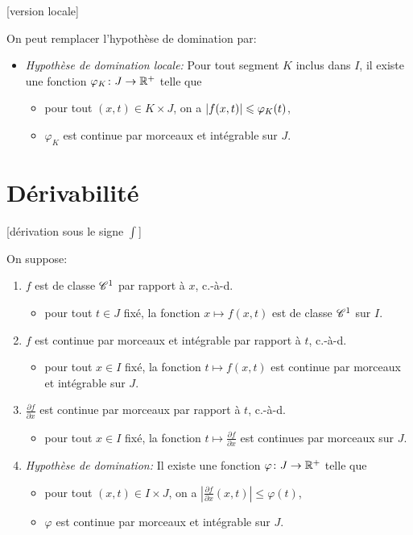 \documentclass{yann}
\newcommand\DerPart[2]{\frac{\partial#1}{\partial#2}}
\begin{document}
[version locale]

On peut remplacer l'hypothèse de domination par:
\begin{itemize}
\item
\emph{Hypothèse de domination locale:}
  Pour tout segment $K$ inclus dans $I$,
  il existe une fonction $\varphi_K \colon J \to \mathbb{R}^+$ telle que

  \begin{itemize}
  \item
pour tout $(x,t)\in K\times J$, on a $\left|{f(x,t)}\right|\leqslant\varphi_K(t)$,
  \item
$\varphi_K$ est continue par morceaux et intégrable sur $J$.
  \end{itemize}
\end{itemize}

\section{Dérivabilité}

[dérivation sous le signe $\int$]

On suppose:
\begin{enumerate}
\item
$f$ est de classe $\mathscr{C}^{1}$ par rapport à $x$, c.-à-d.

  \begin{itemize}
  \item
pour tout $t\in J$ fixé, la fonction $x \mapsto f(x,t)$
    est de classe $\mathscr{C}^{1}$ sur $I$.
  \end{itemize}
\item
$f$ est continue par morceaux et intégrable par rapport à $t$, c.-à-d.

  \begin{itemize}
  \item
pour tout $x\in I$ fixé, la fonction $t \mapsto f(x,t)$
    est continue par morceaux et intégrable sur $J$.
  \end{itemize}
\item
$\DerPart fx$ est continue par morceaux par rapport à $t$, c.-à-d.

  \begin{itemize}
  \item
pour tout $x\in I$ fixé, la fonction $t \mapsto \DerPart fx$
    est continues par morceaux sur $J$.
  \end{itemize}
\item
\emph{Hypothèse de domination:}
  Il existe une fonction $\varphi\colon J \to \mathbb{R}^+$ telle que

  \begin{itemize}
  \item
pour tout $(x,t)\in I\times J$, on a $\left| \DerPart fx(x,t) \right| \leq \varphi(t)$,
  \item
$\varphi$ est continue par morceaux et intégrable sur $J$.
  \end{itemize}
\end{enumerate}
\end{document}
